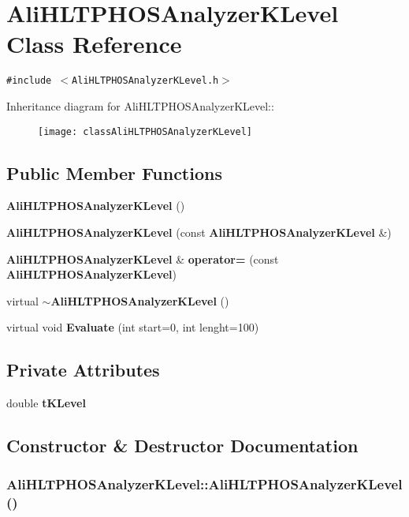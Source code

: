 \section{Ali\-HLTPHOSAnalyzer\-KLevel Class Reference}
\label{classAliHLTPHOSAnalyzerKLevel}
{\tt \#include $<$Ali\-HLTPHOSAnalyzer\-KLevel.h$>$}

Inheritance diagram for Ali\-HLTPHOSAnalyzer\-KLevel::\begin{figure}[H]
\begin{center}
\leavevmode
\texttt{[image: classAliHLTPHOSAnalyzerKLevel]}
\end{center}
\end{figure}
\subsection*{Public Member Functions}
\begin{CompactItemize}
\item 
{\bf Ali\-HLTPHOSAnalyzer\-KLevel} ()
\item 
{\bf Ali\-HLTPHOSAnalyzer\-KLevel} (const {\bf Ali\-HLTPHOSAnalyzer\-KLevel} \&)
\item 
{\bf Ali\-HLTPHOSAnalyzer\-KLevel} \& {\bf operator=} (const {\bf Ali\-HLTPHOSAnalyzer\-KLevel})
\item 
virtual {\bf $\sim$Ali\-HLTPHOSAnalyzer\-KLevel} ()
\item 
virtual void {\bf Evaluate} (int start=0, int lenght=100)
\end{CompactItemize}
\subsection*{Private Attributes}
\begin{CompactItemize}
\item 
double {\bf t\-KLevel}
\end{CompactItemize}


\subsection{Constructor \& Destructor Documentation}
\subsubsection{\setlength{\rightskip}{0pt plus 5cm}Ali\-HLTPHOSAnalyzer\-KLevel::Ali\-HLTPHOSAnalyzer\-KLevel ()}\label{classAliHLTPHOSAnalyzerKLevel_a0}


